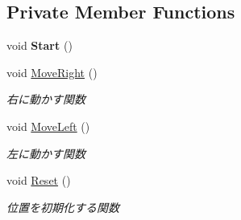 \subsection*{Private Member Functions}
\begin{DoxyCompactItemize}
\item 
\mbox{\label{class_stage_name_obj_a8a7797611e699619e43f73da321232a0}} 
void {\bfseries Start} ()
\item 
void \hyperlink{class_stage_name_obj_a05588c0b4fdc4ab72441f92fbc42db08}{Move\+Right} ()
\begin{DoxyCompactList}\small\item\em 右に動かす関数 \end{DoxyCompactList}\item 
void \hyperlink{class_stage_name_obj_a5467165970c410d681afc17e244229be}{Move\+Left} ()
\begin{DoxyCompactList}\small\item\em 左に動かす関数 \end{DoxyCompactList}\item 
void \hyperlink{class_stage_name_obj_acbf692d5c36a154cc860a0608e4c7166}{Reset} ()
\begin{DoxyCompactList}\small\item\em 位置を初期化する関数 \end{DoxyCompactList}\end{DoxyCompactItemize}
